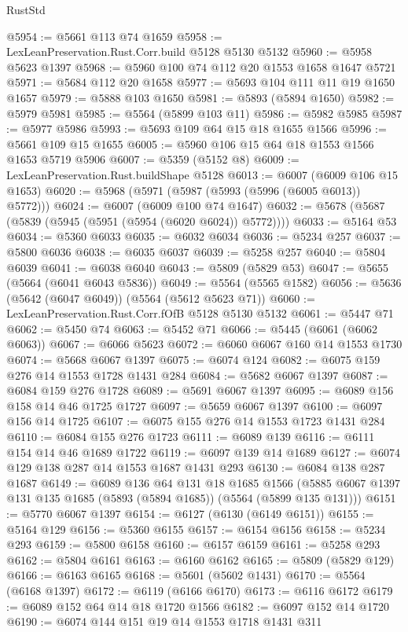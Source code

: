 \begin{lexlean}{RustStd}
\begin{coremodule}
@5954 := @5661 @113 @74 @1659
@5958 := LexLeanPreservation.Rust.Corr.build @5128 @5130 @5132
@5960 := @5958 @5623 @1397
@5968 := @5960 @100 @74 @112 @20 @1553 @1658 @1647 @5721
@5971 := @5684 @112 @20 @1658
@5977 := @5693 @104 @111 @11 @19 @1650 @1657
@5979 := @5888 @103 @1650
@5981 := @5893 (@5894 @1650)
@5982 := @5979 @5981
@5985 := @5564 (@5899 @103 @11)
@5986 := @5982 @5985
@5987 := @5977 @5986
@5993 := @5693 @109 @64 @15 @18 @1655 @1566
@5996 := @5661 @109 @15 @1655
@6005 := @5960 @106 @15 @64 @18 @1553 @1566 @1653 @5719 @5906
@6007 := @5359 (@5152 @8)
@6009 := LexLeanPreservation.Rust.buildShape @5128
@6013 := @6007 (@6009 @106 @15 @1653)
@6020 := @5968 (@5971 (@5987 (@5993 (@5996 (@6005 @6013)) @5772)))
@6024 := @6007 (@6009 @100 @74 @1647)
@6032 := @5678 (@5687 (@5839 (@5945 (@5951 (@5954 (@6020 @6024)) @5772))))
@6033 := @5164 @53
@6034 := @5360 @6033
@6035 := @6032 @6034
@6036 := @5234 @257
@6037 := @5800 @6036
@6038 := @6035 @6037
@6039 := @5258 @257
@6040 := @5804 @6039
@6041 := @6038 @6040
@6043 := @5809 (@5829 @53)
@6047 := @5655 (@5664 (@6041 @6043 @5836))
@6049 := @5564 (@5565 @1582)
@6056 := @5636 (@5642 (@6047 @6049)) (@5564 (@5612 @5623 @71))
@6060 := LexLeanPreservation.Rust.Corr.fOfB @5128 @5130 @5132
@6061 := @5447 @71
@6062 := @5450 @74
@6063 := @5452 @71
@6066 := @5445 (@6061 (@6062 @6063))
@6067 := @6066 @5623
@6072 := @6060 @6067 @160 @14 @1553 @1730
@6074 := @5668 @6067 @1397
@6075 := @6074 @124
@6082 := @6075 @159 @276 @14 @1553 @1728 @1431 @284
@6084 := @5682 @6067 @1397
@6087 := @6084 @159 @276 @1728
@6089 := @5691 @6067 @1397
@6095 := @6089 @156 @158 @14 @46 @1725 @1727
@6097 := @5659 @6067 @1397
@6100 := @6097 @156 @14 @1725
@6107 := @6075 @155 @276 @14 @1553 @1723 @1431 @284
@6110 := @6084 @155 @276 @1723
@6111 := @6089 @139
@6116 := @6111 @154 @14 @46 @1689 @1722
@6119 := @6097 @139 @14 @1689
@6127 := @6074 @129 @138 @287 @14 @1553 @1687 @1431 @293
@6130 := @6084 @138 @287 @1687
@6149 := @6089
    @136
    @64
    @131
    @18
    @1685
    @1566
    (@5885 @6067 @1397 @131 @135 @1685 (@5893 (@5894 @1685)) (@5564 (@5899 @135 @131)))
@6151 := @5770 @6067 @1397
@6154 := @6127 (@6130 (@6149 @6151))
@6155 := @5164 @129
@6156 := @5360 @6155
@6157 := @6154 @6156
@6158 := @5234 @293
@6159 := @5800 @6158
@6160 := @6157 @6159
@6161 := @5258 @293
@6162 := @5804 @6161
@6163 := @6160 @6162
@6165 := @5809 (@5829 @129)
@6166 := @6163 @6165
@6168 := @5601 (@5602 @1431)
@6170 := @5564 (@6168 @1397)
@6172 := @6119 (@6166 @6170)
@6173 := @6116 @6172
@6179 := @6089 @152 @64 @14 @18 @1720 @1566
@6182 := @6097 @152 @14 @1720
@6190 := @6074 @144 @151 @19 @14 @1553 @1718 @1431 @311

\end{coremodule}
\end{lexlean}
